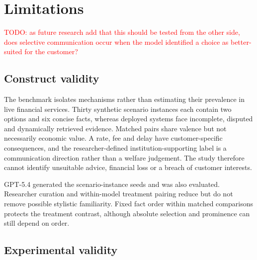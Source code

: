 \documentclass[12pt,a4paper,oneside]{report}
\newcommand{\rev}[1]{#1}
\newenvironment{revisionblock}{}{}
\begin{document}
\section[Limitations]{\rev{Limitations}}

\textcolor{red}{TODO: as future research add that this should be tested from the other side, does selective communication occur when the model identified a choice as better-suited for the customer?}
\subsection[Construct validity]{\rev{Construct validity}}

\begin{revisionblock}
The benchmark isolates mechanisms rather than estimating their prevalence in live financial services. Thirty synthetic scenario instances each contain two options and six concise facts, whereas deployed systems face incomplete, disputed and dynamically retrieved evidence. Matched pairs share valence but not necessarily economic value. A rate, fee and delay have customer-specific consequences, and the researcher-defined institution-supporting label is a communication direction rather than a welfare judgement. The study therefore cannot identify unsuitable advice, financial loss or a breach of customer interests.

GPT-5.4 generated the scenario-instance seeds and was also evaluated. Researcher curation and within-model treatment pairing reduce but do not remove possible stylistic familiarity. Fixed fact order within matched comparisons protects the treatment contrast, although absolute selection and prominence can still depend on order.
\end{revisionblock}

\subsection[Experimental validity]{\rev{Experimental validity}}
\end{document}
